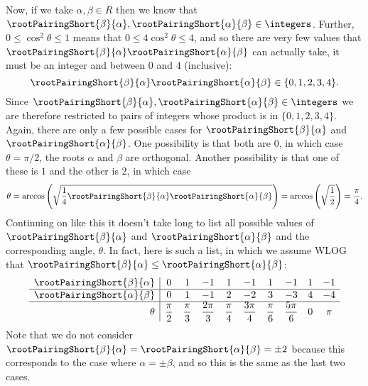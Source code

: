 \documentclass[fleqn]{NotesClass}
\begin{document}
    Now, if we take \(\alpha, \beta \in R\) then we know that \(\rootPairingShort{\beta}{\alpha}, \rootPairingShort{\alpha}{\beta} \in \integers\).
    Further, \(0 \le \cos^2\theta \le 1\) means that \(0 \le 4\cos^2\theta \le 4\), and so there are very few values that \(\rootPairingShort{\beta}{\alpha}\rootPairingShort{\alpha}{\beta}\) can actually take, it must be an integer and between \(0\) and \(4\) (inclusive):
    \begin{equation}
        \rootPairingShort{\beta}{\alpha} \rootPairingShort{\alpha}{\beta} \in \{0, 1, 2, 3, 4\}.
    \end{equation}
    Since \(\rootPairingShort{\beta}{\alpha}, \rootPairingShort{\alpha}{\beta} \in \integers\) we are therefore restricted to pairs of integers whose product is in \(\{0, 1, 2, 3, 4\}\).
    Again, there are only a few possible cases for \(\rootPairingShort{\beta}{\alpha}\) and \(\rootPairingShort{\alpha}{\beta}\).
    One possibility is that both are 0, in which case \(\theta = \pi/2\), the roots \(\alpha\) and \(\beta\) are orthogonal.
    Another possibility is that one of these is \(1\) and the other is \(2\), in which case
    \begin{equation}
        \theta = \arccos\left( \sqrt{\frac{1}{4} \rootPairingShort{\beta}{\alpha} \rootPairingShort{\alpha}{\beta}} \right) = \arccos\left( \sqrt{\frac{1}{2}} \right) = \frac{\pi}{4}.
    \end{equation}
    Continuing on like this it doesn't take long to list all possible values of \(\rootPairingShort{\beta}{\alpha}\) and \(\rootPairingShort{\alpha}{\beta}\) and the corresponding angle, \(\theta\).
    In fact, here is such a list, in which we assume WLOG that \(\rootPairingShort{\beta}{\alpha} \le \rootPairingShort{\alpha}{\beta}\):
    \begin{equation}
        \begin{array}{r|ccccccccc}
            \rootPairingShort{\beta}{\alpha} & 0 & 1 & -1 & 1 & -1 & 1 & -1 & 1 & -1\\ \hline
            \rootPairingShort{\alpha}{\beta} & 0 & 1 & -1 & 2 & -2 & 3 & -3 & 4 & -4\\ \hline
            \theta & \dfrac{\pi}{2} & \dfrac{\pi}{3} & \dfrac{2\pi}{3} & \dfrac{\pi}{4} & \dfrac{3\pi}{4} & \dfrac{\pi}{6} & \dfrac{5\pi}{6} & 0 & \pi\\
        \end{array}
    \end{equation}
    Note that we do not consider \(\rootPairingShort{\beta}{\alpha} = \rootPairingShort{\alpha}{\beta} = \pm 2\) because this corresponds to the case where \(\alpha = \pm\beta\), and so this is the same as the last two cases.
    
\end{document}
